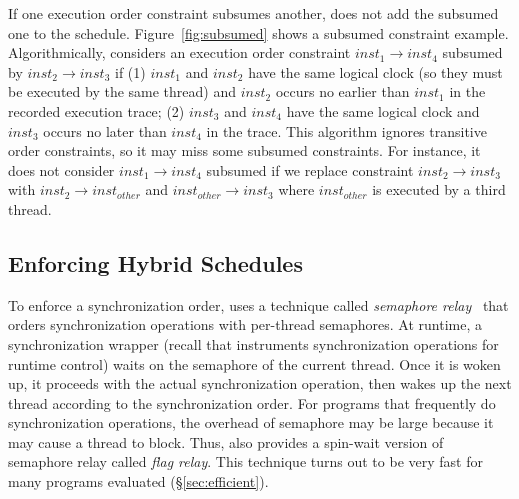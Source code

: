 If one execution order constraint subsumes another, \peregrine does not add the
subsumed one to the schedule.  Figure~\ref{fig:subsumed} shows a subsumed
constraint example.  Algorithmically, \peregrine considers an execution order
constraint $inst_1 \rightarrow inst_4$ subsumed by $inst_2 \rightarrow
inst_3$ if (1) $inst_1$ and $inst_2$ have the same logical clock (so they
must be executed by the same thread) and $inst_2$ occurs no earlier than
$inst_1$ in the recorded execution trace; (2) $inst_3$ and $inst_4$ have
the same logical clock and $inst_3$ occurs no later than $inst_4$ in the
trace.  This algorithm ignores
transitive order constraints, so it may miss some subsumed constraints.
For instance, it does not consider $inst_1 \rightarrow inst_4$ subsumed if
we replace constraint $inst_2 \rightarrow inst_3$ with $inst_2 \rightarrow
inst_{other}$ and $inst_{other} \rightarrow inst_3$ where $inst_{other}$
is executed by a third thread.

\subsection{Enforcing Hybrid Schedules} \label{sec:enforce-schedule}

To enforce a synchronization order, \peregrine uses a technique called
\emph{semaphore relay}~\cite{cui:tern:osdi10} that orders synchronization
operations with per-thread semaphores.
At runtime, a synchronization wrapper
(recall that \peregrine instruments synchronization operations for runtime
control) waits on the semaphore of the current thread.  Once it is woken
up, it proceeds with the actual synchronization operation, then wakes up
the next thread according to the synchronization order.  
For programs that frequently do synchronization operations, the overhead
of semaphore may be large because it may cause a thread to block.  Thus,
\peregrine also provides a spin-wait version of
semaphore relay called \emph{flag relay}.
This technique turns out to be very
fast for many programs evaluated (\S\ref{sec:efficient}).



